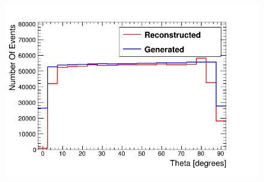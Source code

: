 \begin{figure}[htbp]
 \centering
 \includegraphics[width=0.8\linewidth]{Chapter5/Figs/Raster/hemisphereThetaCompare.png}
 \label{fig:thetaGenVsRecoHem}
\end{figure}

